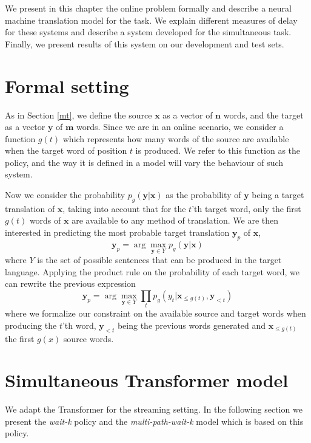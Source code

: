 \documentclass[11pt,english,listoffigures,listoftables]{tfgetsinf}
\newcommand{\vect}[1]{\mathbf{#1}}
\begin{document}
We present in this chapter the online problem formally and describe a neural machine translation model for the task. We explain different measures of delay for these systems and describe a system developed for the simultaneous task. Finally, we  present results of this system on our development and test sets.

\section{Formal setting}
As in Section \ref{mt}, we define the source $\vect{x}$ as a vector of $\vect{n}$ words, and the target as a vector $\vect{y}$ of $\vect{m}$ words. Since we are in an online scenario, we consider a function $g(t)$ which represents how many words of the source are available when the target word of position $t$ is produced. We refer to this function as the policy, and the way it is defined in a model will vary the behaviour of such system.

Now we consider the probability $p_g(\vect{y}|\vect{x})$ as the probability of $\vect{y}$ being a target translation of $\vect{x}$, taking into account that for the $t$'th target word, only the first $g(t)$ words of $\vect{x}$ are available to any method of translation. We are then interested in predicting the most probable target translation $\vect{y}_p$ of $\vect{x}$,
\begin{equation}\label{pg}
    \vect{y}_p = \arg \max_{\vect{y} \in Y} p_g(\vect{y}| \vect{x})
\end{equation}
where $Y$ is the set of possible sentences that can be produced in the target language.
Applying the product rule on the probability of each target word, we can rewrite the previous expression
\begin{equation}
    \vect{y}_p = \arg \max_{\vect{y} \in Y} \prod_{t} p_g(y_t | \vect{x}_{\leq g(t)}, \vect{y}_{<t})
\end{equation}
where we formalize our constraint on the available source and target words when producing the $t$'th word, $\vect{y}_{<t}$ being the previous words generated and $\vect{x}_{\leq g(t)}$ the first $g(x)$ source words. 

\section{Simultaneous Transformer model}
We adapt the Transformer for the streaming setting. In the following section we present the \textit{wait-k} policy and the \textit{multi-path-wait-k} model which is based on this policy.
\end{document}
